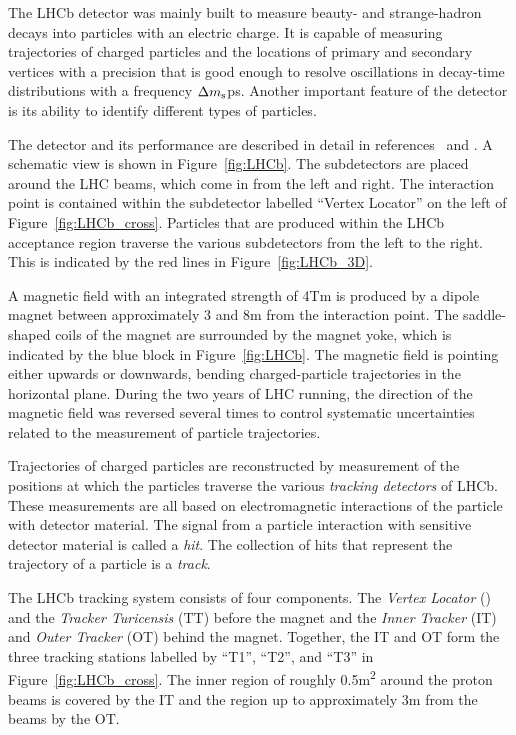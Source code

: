 The LHCb detector was mainly built to measure beauty- and strange-hadron decays into particles with an electric charge. It is capable of
measuring trajectories of charged particles and the locations of primary and secondary vertices with a precision that is good enough to
resolve oscillations in decay-time distributions with a frequency $\Delta m_\text{s}$\unitsp{}ps. Another important feature of the detector
is its ability to identify different types of particles.

The detector and its performance are described in detail in references~\cite{Alves:2008zz} and \cite{LHCb-DP-2014-002}. A schematic view is
shown in Figure~\ref{fig:LHCb}. The subdetectors are placed around the LHC beams, which come in from the left and right. The interaction
point is contained within the subdetector labelled ``Vertex Locator'' on the left of Figure~\ref{fig:LHCb_cross}. Particles that are
produced within the LHCb acceptance region traverse the various subdetectors from the left to the right. This is indicated by the red lines
in Figure~\ref{fig:LHCb_3D}.

A magnetic field with an integrated strength of 4\unitsp{}Tm is produced by a dipole magnet between approximately 3 and 8\unitsp{}m from
the interaction point. The saddle-shaped coils of the magnet are surrounded by the magnet yoke, which is indicated by the blue block in
Figure~\ref{fig:LHCb}. The magnetic field is pointing either upwards or downwards, bending charged-particle trajectories in the horizontal
plane. During the two years of LHC running, the direction of the magnetic field was reversed several times to control systematic
uncertainties related to the measurement of particle trajectories.

Trajectories of charged particles are reconstructed by measurement of the positions at which the particles traverse the various
\emph{tracking detectors} of LHCb. These measurements are all based on electromagnetic interactions of the particle with detector material.
The signal from a particle interaction with sensitive detector material is called a \emph{hit}. The collection of hits that represent the
trajectory of a particle is a \emph{track}.

The LHCb tracking system consists of four components. The \emph{Vertex Locator} (\velo) and the \emph{Tracker Turicensis} (TT)
before the magnet and the \emph{Inner Tracker} (IT) and \emph{Outer Tracker} (OT) behind the magnet. Together, the IT and OT form the
three tracking stations labelled by ``T1'', ``T2'', and ``T3'' in Figure~\ref{fig:LHCb_cross}. The inner region of roughly
0.5\unitsp{}m\textsuperscript{2} around the proton beams is covered by the IT and the region up to approximately 3\unitsp{}m from the beams
by the OT.

